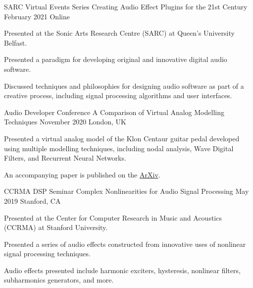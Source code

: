 \begin{cventries}
  \cventry
    {SARC Virtual Events Series} %
    {Creating Audio Effect Plugins for the 21st Century} %
    {February 2021} %
    {Online} %
    {
      \begin{cvitems} %
        \item {Presented at the Sonic Arts Research Centre (SARC) at Queen's University Belfast.}
        \item {Presented a paradigm for developing original and innovative digital audio software.}
        \item {Discussed techniques and philosophies for designing audio software as part of a creative process,
               including signal processing algorithms and user interfaces.}
      \end{cvitems}
    }

  \cventry
    {Audio Developer Conference} %
    {A Comparison of Virtual Analog Modelling Techniques} %
    {November 2020} %
    {London, UK} %
    {
      \begin{cvitems} %
        \item {Presented a virtual analog model of the Klon Centaur guitar pedal
               developed using multiple modelling techniques, including nodal
               analysis, Wave Digital Filters, and Recurrent Neural Networks.}
        \item {An accompanying paper is published on the \href{https://arxiv.org/abs/2009.02833}{ArXiv}.}
      \end{cvitems}
    }

  \cventry
    {CCRMA DSP Seminar} %
    {Complex Nonlinearities for Audio Signal Processing} %
    {May 2019} %
    {Stanford, CA} %
    {
      \begin{cvitems} %
        \item {Presented at the Center for Computer Research in Music and Acoustics (CCRMA) at Stanford University.}
        \item {Presented a series of audio effects constructed from
               innovative uses of nonlinear signal processing techniques.}
        \item {Audio effects presented include harmonic exciters, hysteresis,
               nonlinear filters, subharmonics generators, and more.}
      \end{cvitems}
    }


\end{cventries}
